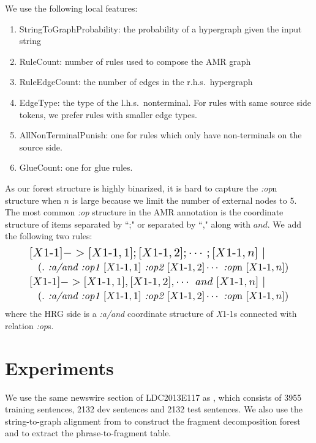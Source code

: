We use the following local features:
\begin{enumerate}\footnotesize
    \item StringToGraphProbability: the probability of a hypergraph given the input string
    \item RuleCount: number of rules used to compose the AMR graph
    \item RuleEdgeCount: the number of edges in the r.h.s.\ hypergraph 
    \item EdgeType: the type of the l.h.s.\ nonterminal. For rules with same source side tokens, we prefer rules with smaller edge types.
    \item AllNonTerminalPunish: one for rules which only have non-terminals on the source side.
    \item GlueCount: one for glue rules.  
\end{enumerate}
As our forest structure is highly binarized, it is hard to capture the \textit{:op}n structure when $n$ is large because we limit the number
of external nodes to 5. The most common \textit{:op} structure in the AMR annotation is the coordinate structure of items separated by ``;" or separated by ``," along with
$and$. We add the following two rules:
\begin{align*}
    &\resizebox{.8\hsize}{!}{$[X\text{1-1}] -> [X\text{1-1}, 1] ; [X\text{1-1}, 2] ; \cdots ; [X\text{1-1}, n]\ |$}\\
    &\quad \resizebox{.85\hsize}{!}{$(. \textit{ :a/and :op1 } [X\text{1-1}, 1] \textit{ :op2 } [X\text{1-1}, 2] \cdots \textit{ :op}\text{n}\ [X\text{1-1}, n] )$} \\
    &\resizebox{.8\hsize}{!}{$[X\text{1-1}] -> [X\text{1-1}, 1] , [X\text{1-1}, 2] , \cdots \textit{ and } [X\text{1-1}, n]\ |$}\\
    &\quad \resizebox{.85\hsize}{!}{$(. \textit{ :a/and :op1 } [X\text{1-1}, 1] \textit{ :op2 } [X\text{1-1}, 2] \cdots \textit{ :op}\text{n}\ [X\text{1-1}, n] )$} 
\end{align*}
where the HRG side is a \textit{:a/and} coordinate structure of \textit{X}1-1s connected with relation \textit{:op}s.
\section{Experiments}
We use the same newswire section of LDC2013E117 as , which consists of 3955 training sentences, 2132 dev sentences and 2132 test sentences. We also use 
the string-to-graph alignment from  to construct the fragment decomposition forest and 
to extract the phrase-to-fragment table.


